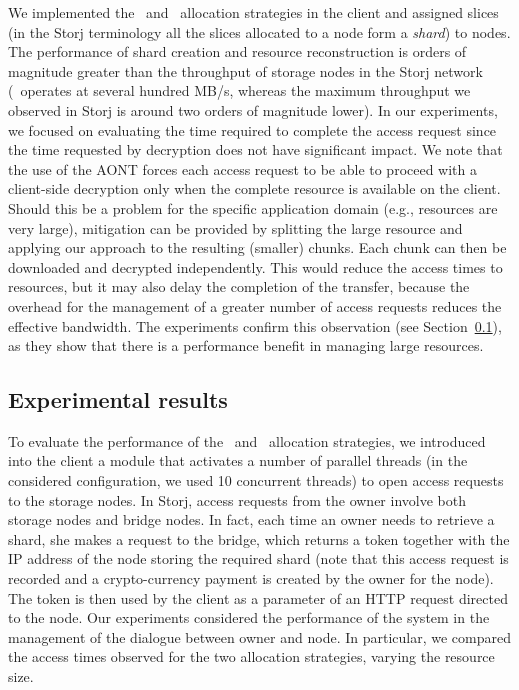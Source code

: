 {We implemented the \diagonal\ and \compact\ allocation strategies in
the client and assigned slices (in the Storj terminology all the
slices allocated to a node form a {\em shard\/}) to nodes. The
performance of shard creation and resource reconstruction is orders of
magnitude greater than the throughput of storage nodes in the Storj
network (\name\ operates at several hundred MB/s, whereas the maximum
throughput we observed in Storj is around two orders of magnitude
lower). In our experiments, we focused on evaluating the time required
to complete the access request since the time requested by decryption
does not have significant impact.  We note that the use of the AONT
forces each access request to be able to proceed with a client-side
decryption only when the complete resource is available on the client.
Should this be a problem for the specific application domain (e.g.,
resources are very large), mitigation can be provided by splitting the
large resource and applying our approach to the resulting (smaller)
chunks. Each chunk can then be downloaded and decrypted
independently. This would reduce the access times to resources, but it
may also delay the completion of the transfer, because the overhead
for the management of a greater number of access requests reduces the
effective bandwidth. The experiments confirm this observation (see
Section~\ref{dcs:ss:results}), as they show that there is a performance
benefit in managing large resources.


\subsection{Experimental results}\label{dcs:ss:results}
To evaluate the performance of the \diagonal\ and \compact\ allocation
strategies, we introduced into the client a module that activates a
number of parallel threads (in the considered configuration, we used
10 concurrent threads) to open access requests to the storage
nodes. In Storj, access requests from the owner involve both storage
nodes and bridge nodes. In fact, each time an owner needs to retrieve
a shard, she makes a request to the bridge, which returns a token
together with the IP address of the node storing the required shard
(note that this access request is recorded and a crypto-currency
payment is created by the owner for the node). The token is then used
by the client as a parameter of an HTTP request directed to the node.
Our experiments considered the performance of the system in the
management of the dialogue between owner and node. In particular, we
compared the access times observed for the two allocation strategies,
varying the resource size.

}
